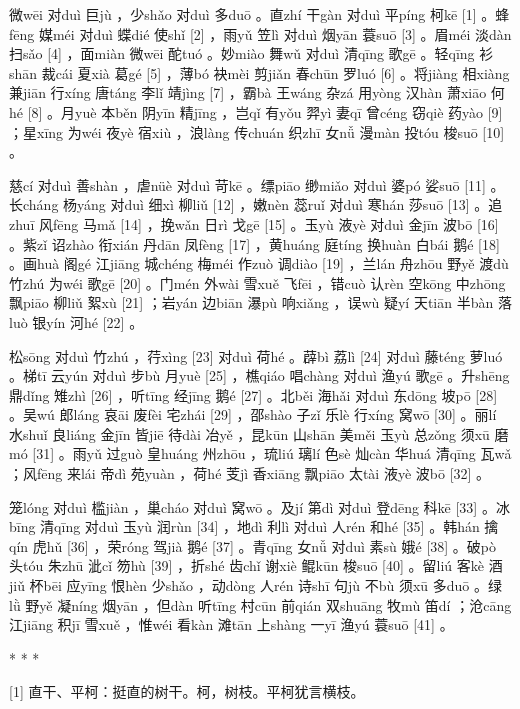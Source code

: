 \documentclass[12pt,UTF8]{ctexbook}
\begin{document}
微wēi 对duì 巨jù ，少shǎo 对duì 多duō 。直zhí 干gàn 对duì 平píng 柯kē [1] 。蜂fēng 媒méi 对duì 蝶dié 使shǐ [2] ，雨yǔ 笠lì 对duì 烟yān 蓑suō [3] 。眉méi 淡dàn 扫sǎo [4] ，面miàn 微wēi 酡tuó 。妙miào 舞wǔ 对duì 清qīng 歌gē 。轻qīng 衫shān 裁cái 夏xià 葛gé [5] ，薄bó 袂mèi 剪jiǎn 春chūn 罗luó [6] 。将jiàng 相xiàng 兼jiān 行xíng 唐táng 李lǐ 靖jìng [7] ，霸bà 王wáng 杂zá 用yòng 汉hàn 萧xiāo 何hé [8] 。月yuè 本běn 阴yīn 精jīng ，岂qǐ 有yǒu 羿yì 妻qī 曾céng 窃qiè 药yào [9] ；星xīng 为wéi 夜yè 宿xiù ，浪làng 传chuán 织zhī 女nǚ 漫màn 投tóu 梭suō [10] 。

慈cí 对duì 善shàn ，虐nüè 对duì 苛kē 。缥piāo 缈miǎo 对duì 婆pó 娑suō [11] 。长cháng 杨yáng 对duì 细xì 柳liǔ [12] ，嫩nèn 蕊ruǐ 对duì 寒hán 莎suō [13] 。追zhuī 风fēng 马mǎ [14] ，挽wǎn 日rì 戈gē [15] 。玉yù 液yè 对duì 金jīn 波bō [16] 。紫zǐ 诏zhào 衔xián 丹dān 凤fèng [17] ，黄huáng 庭tíng 换huàn 白bái 鹅é [18] 。画huà 阁gé 江jiāng 城chéng 梅méi 作zuò 调diào [19] ，兰lán 舟zhōu 野yě 渡dù 竹zhú 为wéi 歌gē [20] 。门mén 外wài 雪xuě 飞fēi ，错cuò 认rèn 空kōng 中zhōng 飘piāo 柳liǔ 絮xù [21] ；岩yán 边biān 瀑pù 响xiǎng ，误wù 疑yí 天tiān 半bàn 落luò 银yín 河hé [22] 。

松sōng 对duì 竹zhú ，荇xìng [23] 对duì 荷hé 。薜bì 荔lì [24] 对duì 藤téng 萝luó 。梯tī 云yún 对duì 步bù 月yuè [25] ，樵qiáo 唱chàng 对duì 渔yú 歌gē 。升shēng 鼎dǐng 雉zhì [26] ，听tīng 经jīng 鹅é [27] 。北běi 海hǎi 对duì 东dōng 坡pō [28] 。吴wú 郎láng 哀āi 废fèi 宅zhái [29] ，邵shào 子zǐ 乐lè 行xíng 窝wō [30] 。丽lí 水shuǐ 良liáng 金jīn 皆jiē 待dài 冶yě ，昆kūn 山shān 美měi 玉yù 总zǒng 须xū 磨mó [31] 。雨yǔ 过guò 皇huáng 州zhōu ，琉liú 璃lí 色sè 灿càn 华huá 清qīng 瓦wǎ ；风fēng 来lái 帝dì 苑yuàn ，荷hé 芰jì 香xiāng 飘piāo 太tài 液yè 波bō [32] 。

笼lóng 对duì 槛jiàn ，巢cháo 对duì 窝wō 。及jí 第dì 对duì 登dēng 科kē [33] 。冰bīng 清qīng 对duì 玉yù 润rùn [34] ，地dì 利lì 对duì 人rén 和hé [35] 。韩hán 擒qín 虎hǔ [36] ，荣róng 驾jià 鹅é [37] 。青qīng 女nǚ 对duì 素sù 娥é [38] 。破pò 头tóu 朱zhū 泚cǐ 笏hù [39] ，折shé 齿chǐ 谢xiè 鲲kūn 梭suō [40] 。留liú 客kè 酒jiǔ 杯bēi 应yīng 恨hèn 少shǎo ，动dòng 人rén 诗shī 句jù 不bù 须xū 多duō 。绿lǜ 野yě 凝níng 烟yān ，但dàn 听tīng 村cūn 前qián 双shuāng 牧mù 笛dí ；沧cāng 江jiāng 积jī 雪xuě ，惟wéi 看kàn 滩tān 上shàng 一yī 渔yú 蓑suō [41] 。



* * *



[1] 直干、平柯：挺直的树干。柯，树枝。平柯犹言横枝。
\end{document}

